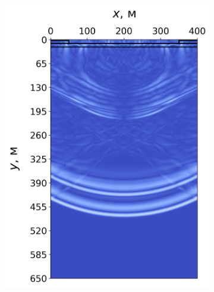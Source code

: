 \newpage
\begin{figure}[H]
    \centering
    \begin{subfigure}{0.49\textwidth}
        \centering
        \includegraphics[width=\textwidth]{images/gas_field/004000.png}
    \end{subfigure}
    \hfill
    \begin{subfigure}{0.49\textwidth}
        \centering

\end{subfigure}
\end{figure}
